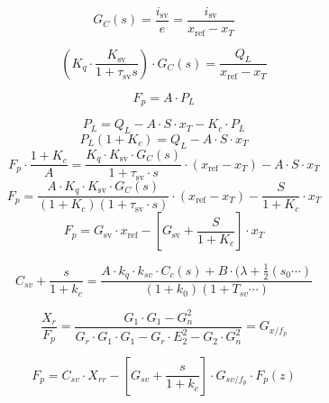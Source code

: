 \begin{equation}
G_C(s) = \frac{i_{\text{sv}}}{e} = \frac{i_{\text{sv}}}{x_{\text{ref}} - x_T} %
\end{equation}

\begin{equation}
\left(K_q \cdot \frac{K_{\text{sv}}}{1 + \tau_{\text{sv}} s}\right) \cdot G_C(s) = \frac{Q_L}{x_{\text{ref}} - x_T} 
\end{equation}

\begin{equation}
    F_p = A \cdot P_L
\end{equation}



\begin{equation}
P_L = Q_L - A \cdot S \cdot x_T - K_c \cdot P_L
\end{equation}
\begin{equation}
P_L (1 + K_c) = Q_L - A \cdot S \cdot x_T
\end{equation}
\begin{equation}
F_p \cdot \frac{1 + K_c}{A} = \frac{K_q \cdot K_{\text{sv}} \cdot G_C(s)}{1 + \tau_{\text{sv}} \cdot s} \cdot (x_{\text{ref}} - x_T) - A \cdot S \cdot x_T \tag{1}
\end{equation}
\begin{equation}
F_p = \frac{A \cdot K_q \cdot K_{\text{sv}} \cdot G_C(s)}{(1 + K_c)(1 + \tau_{\text{sv}} \cdot s)} \cdot (x_{\text{ref}} - x_T) - \frac{S}{1 + K_c} \cdot x_T \tag{2}
\end{equation}
\begin{equation}
F_p = G_{\text{sv}} \cdot x_{\text{ref}} - \left[G_{\text{sv}} + \frac{S}{1 + K_c}\right] \cdot x_T \tag{3}
\end{equation}


\begin{equation}
 C_{sv}+\frac{s}{1+k_{c}}=\frac{A\cdot k_{q}\cdot k_{sv}\cdot C_{c}(s)+B\cdot(\lambda+\frac{1}{2}(s_{0}\cdots)}{(1+k_{0})(1+T_{sv}\cdots)} 
 \end{equation}
 
 \begin{equation}
 \frac{X_{r}}{F_{p}}=\frac{G_{1}\cdot G_{1}-G_{n}^{2}}{G_{r}\cdot G_{1}\cdot G_{1}-G_{r}\cdot E_{2}^{2}-G_{2}\cdot G_{n}^{2}}=G_{x/f_{p}}
  \end{equation}
  
 \begin{equation}
 F_{p}=C_{sv}\cdot X_{rr}-[G_{sv}+\frac{s}{1+k_{c}}]\cdot G_{sv/f_{p}}\cdot F_{p}(z)
   \end{equation}
  
